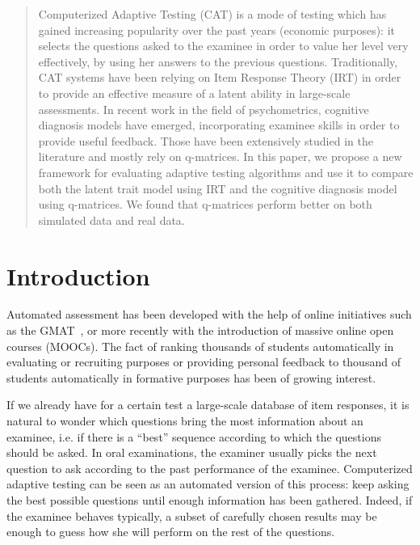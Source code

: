 \documentclass{sig-alternate}
\begin{document}
\maketitle
\begin{abstract}
Computerized Adaptive Testing (CAT) is a mode of testing which has gained increasing popularity over the past years (economic purposes): it selects the questions asked to the examinee in order to value her level very effectively, by using her answers to the previous questions.
Traditionally, CAT systems have been relying on Item Response Theory (IRT) in order to provide an effective measure of a latent ability in large-scale assessments.
In recent work in the field of psychometrics, cognitive diagnosis models have emerged, incorporating examinee skills in order to provide useful feedback. Those have been extensively studied in the literature and mostly rely on q-matrices.
In this paper, we propose a new framework for evaluating adaptive testing algorithms and use it to compare both the latent trait model using IRT and the cognitive diagnosis model using q-matrices.
We found that q-matrices perform better on both simulated data and real data.
\end{abstract}




\section{Introduction}
Automated assessment has been developed with the help of online initiatives such as the GMAT~\cite{Rudner2010}, or more recently with the introduction of massive online open courses (MOOCs). The fact of ranking thousands of students automatically in evaluating or recruiting purposes or providing personal feedback to thousand of students automatically in formative purposes has been of growing interest.

If we already have for a certain test a large-scale database of item responses, it is natural to wonder which questions bring the most information about an examinee, i.e. if there is a ``best'' sequence according to which the questions should be asked. In oral examinations, the examiner usually picks the next question to ask according to the past performance of the examinee. Computerized adaptive testing can be seen as an automated version of this process: keep asking the best possible questions until enough information has been gathered. Indeed, if the examinee behaves typically, a subset of carefully chosen results may be enough to guess how she will perform on the rest of the questions.
\end{document}
